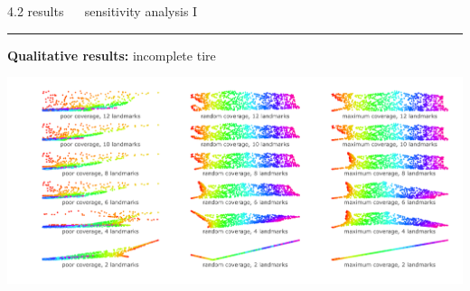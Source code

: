\documentclass[11pt, compress, t, notes = noshow, xcolor = table, 
aspectratio = 1610]{beamer}
\begin{document}

\LARGE
\begin{frame}{\textcolor{gray!90}{4.2 results} ~~ sensitivity analysis I}
\normalsize
\vspace{-0.5cm}
\noindent \textcolor{gray!90}{\rule{\textwidth}{1pt}}
\smallskip

\textbf{Qualitative results:} incomplete tire

\vspace{0.3cm}

\includegraphics[trim = 40 10 0 0, clip, %
    width = \textwidth]{figures/sensitivity_landmarks_qual_incomplete_tire}

\end{frame}

\end{document}
